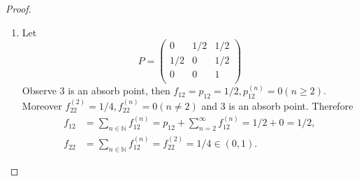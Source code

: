 \documentclass[12pt]{article}
\renewcommand{\(}{\left(}%
\renewcommand{\)}{\right)}%
\renewcommand{\[}{\left[}%
\renewcommand{\]}{\right]}%
\newcommand{\n}{\mathbb{N}}
\newtheorem{proof}{Proof.}}
\begin{document}
\begin{proof}
\begin{enumerate}
\begin{enumerate}
   		 	\begin{equation*}
   		 		\begin{split}
   		 			f_{12}&=\sum_{n\in\n}f_{12}^{(n)}=p_{12}+\sum_{n=2}^\infty f_{12}^{(n)}=1+0=1,\\
   		 			f_{22}&=\sum_{n\in\n}f_{12}^{(n)}= f^{(2)}_{22}=1/2\in(0,1).
   		 		\end{split}
   		 	\end{equation*}
   		 	\item Let 
   		 	\begin{equation*}
   		 		P=
   		 		\begin{pmatrix}
   		 			0 & 1/2 & 1/2\\
   		 			1/2 & 0 & 1/2\\
   		 			0 & 0 & 1\\
   		 		\end{pmatrix}
   		 	\end{equation*}
   		 	Observe $3$ is an absorb point, then $f_{12}=p_{12}=1/2,p_{12}^{(n)}=0(n\geq 2)$. Moreover $f_{22}^{(2)}=1/4,f_{22}^{(n)}=0(n\neq 2)$ and $3$ is an absorb point. Therefore
   		 	\begin{equation*}
   		 		\begin{split}
   		 			f_{12}&=\sum_{n\in\n}f_{12}^{(n)}=p_{12}+\sum_{n=2}^\infty f_{12}^{(n)}=1/2+0=1/2,\\
   		 			f_{22}&=\sum_{n\in\n}f_{12}^{(n)}= f^{(2)}_{22}=1/4\in(0,1).
   		 		\end{split}
   		 	\end{equation*}
   		\end{enumerate}
   	\end{enumerate}
   \end{proof}
  
\end{document}
